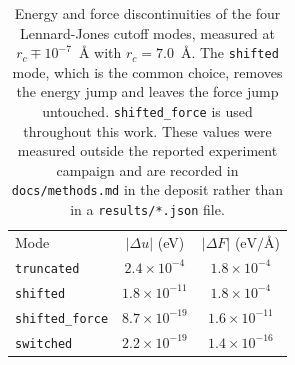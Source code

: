 \documentclass[aip,jcp,reprint,amsmath,amssymb,floatfix]{revtex4-2}
\newcommand{\eVA}{\ensuremath{\mathrm{eV}/\text{\AA}}}
\begin{document}
\begin{table}[t]
\caption{\label{tab:cutoff}%
Energy and force discontinuities of the four Lennard-Jones cutoff modes,
measured at $r_c \mp 10^{-7}$~\AA{} with $r_c = 7.0$~\AA. The
\texttt{shifted} mode, which is the common choice, removes the energy jump and
leaves the force jump untouched. \texttt{shifted\_force} is used throughout this
work. These values were measured outside the reported experiment campaign and
are recorded in \texttt{docs/methods.md} in the deposit rather than in a
\texttt{results/*.json} file.}
\begin{ruledtabular}
\begin{tabular}{lcc}
Mode & $|\Delta u|$ (eV) & $|\Delta F|$ ($\eVA$) \\
\colrule
\texttt{truncated}     & $2.4\times10^{-4}$  & $1.8\times10^{-4}$ \\
\texttt{shifted}       & $1.8\times10^{-11}$ & $1.8\times10^{-4}$ \\
\texttt{shifted\_force}& $8.7\times10^{-19}$ & $1.6\times10^{-11}$ \\
\texttt{switched}      & $2.2\times10^{-19}$ & $1.4\times10^{-16}$ \\
\end{tabular}
\end{ruledtabular}
\end{table}
\end{document}
